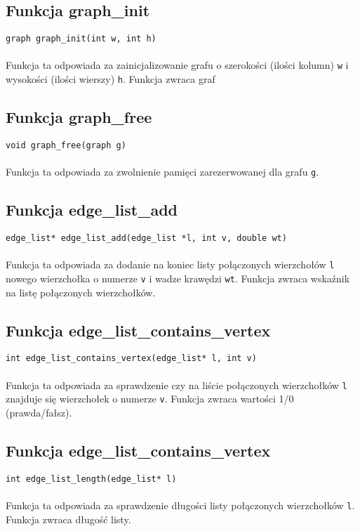 \documentclass[11pt,a4paper]{report}
\begin{document}
    \subsection{Funkcja graph\_init}
    \verb|graph graph_init(int w, int h)|\\
    \\
    Funkcja ta odpowiada za zainicjalizowanie grafu o szerokości (ilości kolumn) \verb|w| i wysokości (ilości wierszy) \verb|h|. Funkcja zwraca graf\\
    \subsection{Funkcja graph\_free}
    \verb|void graph_free(graph g)|\\
    \\
    Funkcja ta odpowiada za zwolnienie pamięci zarezerwowanej dla grafu \verb|g|.\\
    \subsection{Funkcja edge\_list\_add}
    \verb|edge_list* edge_list_add(edge_list *l, int v, double wt)|\\
    \\
    Funkcja ta odpowiada za dodanie na koniec listy połączonych wierzchołów \verb|l| nowego wierzchołka o numerze \verb|v| i wadze krawędzi \verb|wt|. Funkcja zwraca wskaźnik na listę połączonych wierzchołków.\\
    \subsection{Funkcja edge\_list\_contains\_vertex}
    \verb|int edge_list_contains_vertex(edge_list* l, int v)|\\
    \\
    Funkcja ta odpowiada za sprawdzenie czy na liście połączonych wierzchołków \verb|l| znajduje się wierzchołek o numerze \verb|v|. Funkcja zwraca wartości 1/0 (prawda/fałsz).\\
    \subsection{Funkcja edge\_list\_contains\_vertex}
    \verb|int edge_list_length(edge_list* l)|\\
    \\
    Funkcja ta odpowiada za sprawdzenie długości listy połączonych wierzchołków \verb|l|. Funkcja zwraca długość listy.\\
\end{document}
